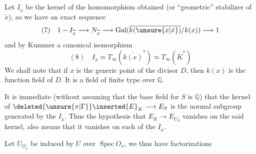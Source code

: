 Let $I_{\widetilde x}$ be the kernel of the homomorphism obtained
(or ``geometric'' stabilizer of $\widetilde x$), so
we have an exact sequence
\[
(7)\quad 1-I_{\widetilde x}\longrightarrow N_{\widetilde x}\longrightarrow\operatorname{Gal}(\overline{k(\unsure{x|\dot{x}})}/k(x))\longrightarrow1
\]
and by Kummer a canonical isomorphism
\[
(8)\quad I_{\widetilde x}\simeq T_\infty(\overline{k(x)}^*)\simeq T_\infty(\overline K^*)
\]
We shall note that if $x$ is the generic point of the
divisor $D$, then $k(x)$ is the function
field of $D$. It is a field of
finite type over $\mathbb Q$.

It is immediate (without assuming that the
base field for $S$ is $\mathbb Q$) that
the kernel of $\deleted{\unsure{\pi|\Gamma}}\inserted{E}_K\longrightarrow E_S$ is the normal subgroup
generated by the $I_{\widetilde x}$. Thus
the hypothesis that $E_K\longrightarrow E_{U_S}$ vanishes
on the said kernel, also means that it
vanishes on each of the $I_{\widetilde x}$.

Let  $U_{\underline O_x}$ be induced by $U$ over
$\operatorname{Spec}O_x$, we thus have factorizations
